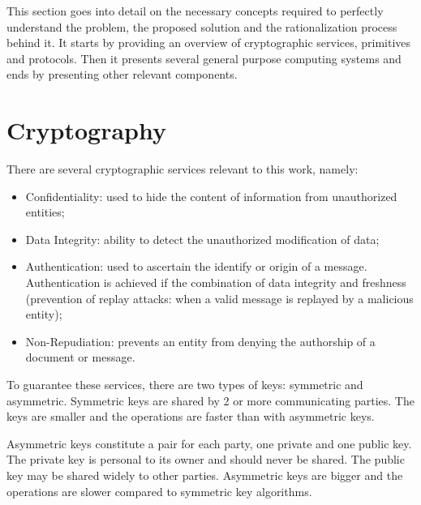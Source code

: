 \cleardoublepage
\label{chap:background}

This section goes into detail on the necessary concepts required to perfectly understand the problem, the proposed solution and the rationalization process behind it. It starts by providing an overview of cryptographic services, primitives and protocols. Then it presents several general purpose computing systems and ends by presenting other relevant components.

\section{Cryptography}\label{chap:background:crypto}

There are several cryptographic services relevant to this work, namely:
\begin{itemize}
    \item Confidentiality: used to hide the content of information from unauthorized entities;
    
    \item Data Integrity: ability to detect the unauthorized modification of data;
    
    \item Authentication: used to ascertain the identify or origin of a message. Authentication is achieved if the combination of data integrity and freshness (prevention of replay attacks: when a valid message is replayed by a malicious entity);
    
    \item Non-Repudiation: prevents an entity from denying the authorship of a document or message.
\end{itemize}

To  guarantee these services, there are two types of keys: symmetric and asymmetric.
Symmetric keys are shared by 2 or more communicating parties. The keys are smaller and the operations are faster than with asymmetric keys.

Asymmetric keys constitute a pair for each party, one private and one public key. The private key is personal to its owner and should never be shared. The public key may be shared widely to other parties. Asymmetric keys are bigger and the operations are slower compared to symmetric key algorithms.

